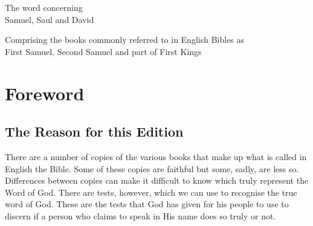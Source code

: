 \clearpage
\begin{center}
{\large The word concerning\\
Samuel, Saul and David}

Comprising the books commonly referred to in English Bibles as\\
First Samuel, Second Samuel and part of First Kings
\end{center}
{ %
\setlength{\parindent}{1.5em}
\section*{Foreword}
\subsection*{The Reason for this Edition}

There are a number of copies of the various books that make up what is called in English the Bible.
Some of these copies are faithful but some,
sadly, are less so. Differences between copies can make it difficult to know
which truly represent the Word of God. There are tests, however, which
we can use to recognise the true word of God. These are the tests that
God has given for his people to use to discern if a person who claims to
speak in His name does so truly or not.

}
